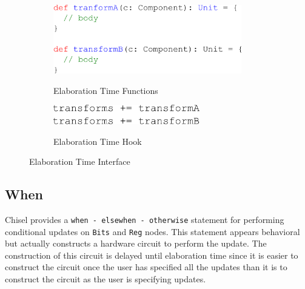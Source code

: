 \begin{figure}[htb]
\centering
  \begin{subfigure}[t]{0.48\textwidth}
  \centering
  \caption{Elaboration Time Functions}
  \includegraphics[width=0.9\textwidth]{figures/transform1.pdf}
  \label{fig:transform1}
  \end{subfigure}
  \hfill
  \begin{subfigure}[t]{0.48\textwidth}
  \centering
  \caption{Elaboration Time Hook}
  \includegraphics[width=0.7\textwidth]{figures/transform2.pdf}
  \label{fig:transform2}
  \end{subfigure}
\caption{Elaboration Time Interface}
\label{fig:transforms}
\end{figure}

\subsection{When}
Chisel provides a {\tt when - elsewhen - otherwise} statement for
performing conditional updates on {\tt Bits} and {\tt Reg}
nodes. This statement appears behavioral but actually constructs a
hardware circuit to perform the update. The construction of this
circuit is delayed until elaboration time since it is easier to
construct the circuit once the user has specified all the updates than
it is to construct the circuit as the user is specifying
updates. 

